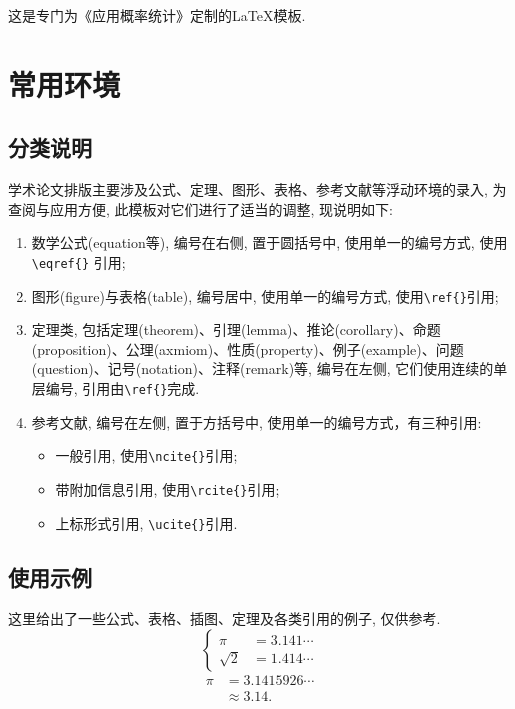 \documentclass[a4paper,c5size,onecolumn,twoside,cap,Chinese]{APSart}
\begin{document}
这是专门为《应用概率统计》定制的\LaTeX{}模板.

\section{常用环境}

\subsection{分类说明}

学术论文排版主要涉及公式、定理、图形、表格、参考文献等浮动环境的录入, 为查阅与应用方便, 此模板对它们进行了适当的调整, 现说明如下:
\begin{enumerate}\setlength{\itemsep}{-0.1ex}
\item 数学公式(equation等), 编号在右侧, 置于圆括号中, 使用单一的编号方式, 使用\verb|\eqref{}| 引用;
\item 图形(figure)与表格(table), 编号居中, 使用单一的编号方式, 使用\verb|\ref{}|引用;
\item 定理类, 包括定理(theorem)、引理(lemma)、推论(corollary)、命题(proposition)、公理(axmiom)、性质(property)、例子(example)、问题(question)、记号(notation)、注释(remark)等, 编号在左侧, 它们使用连续的单层编号, 引用由\verb|\ref{}|完成.
\item 参考文献, 编号在左侧, 置于方括号中, 使用单一的编号方式，有三种引用:
\begin{itemize}
\item 一般引用, 使用\verb|\ncite{}|引用;
\item 带附加信息引用, 使用\verb|\rcite{}|引用;
\item 上标形式引用, \verb|\ucite{}|引用.
\end{itemize}
\end{enumerate}

\subsection{使用示例}

这里给出了一些公式、表格、插图、定理及各类引用的例子, 仅供参考.
\begin{equation}\label{eq:1}
\left\{\begin{aligned}
          \pi&=3.141\cdots\\
     \sqrt{2}&=1.414\cdots
         \end{aligned} \right.
\end{equation}
\begin{align}
          \pi&=3.1415926\cdots\nonumber\\
            &\approx 3.14.
\end{align}
\end{document}
